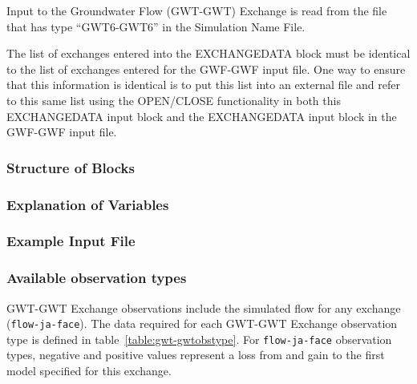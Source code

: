 Input to the Groundwater Flow (GWT-GWT) Exchange is read from the file that has type ``GWT6-GWT6'' in the Simulation Name File.

The list of exchanges entered into the EXCHANGEDATA block must be identical to the list of exchanges entered for the GWF-GWF input file.  One way to ensure that this information is identical is to put this list into an external file and refer to this same list using the OPEN/CLOSE functionality in both this EXCHANGEDATA input block and the EXCHANGEDATA input block in the GWF-GWF input file.

\vspace{5mm}
\subsubsection{Structure of Blocks}




\vspace{5mm}
\subsubsection{Explanation of Variables}
\begin{description}

\end{description}

\vspace{5mm}
\subsubsection{Example Input File}


\vspace{5mm}
\subsubsection{Available observation types}
GWT-GWT Exchange observations include the simulated flow for any exchange (\texttt{flow-ja-face}). The data required for each GWT-GWT Exchange observation type is defined in table~\ref{table:gwt-gwtobstype}. For \texttt{flow-ja-face} observation types, negative and positive values represent a loss from and gain to the first model specified for this exchange.

